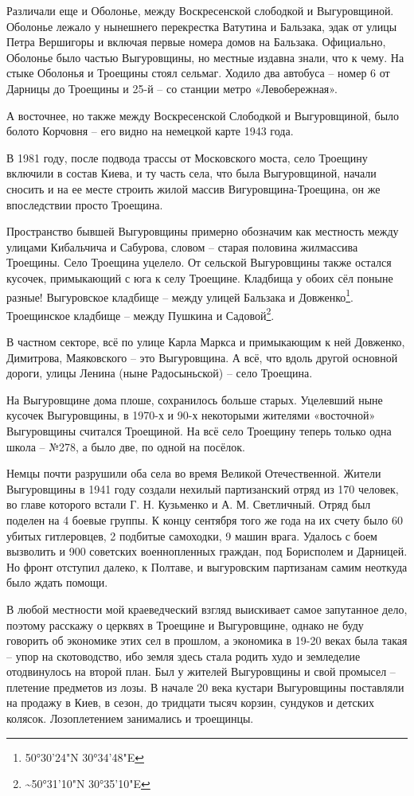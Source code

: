 Различали еще и Оболонье, между Воскресенской слободкой и Выгуровщиной. Оболонье лежало у нынешнего перекрестка Ватутина и Бальзака, эдак от улицы Петра Вершигоры и включая первые номера домов на Бальзака. Официально, Оболонье было частью Выгуровщины, но местные издавна знали, что к чему. На стыке Оболонья и Троещины стоял сельмаг. Ходило два автобуса – номер 6 от Дарницы до Троещины и 25-й – со станции метро «Левобережная».

А восточнее, но также между Воскресенской Слободкой и Выгуровщиной, было болото Корчовня – его видно на немецкой карте 1943 года.

В 1981 году, после подвода трассы от Московского моста, село Троещину включили в состав Киева, и ту часть села, что была Выгуровщиной, начали сносить и на ее месте строить жилой массив Вигуровщина-Троещина, он же впоследствии просто Троещина.

Пространство бывшей Выгуровщины примерно обозначим как местность между улицами Кибальчича и Сабурова, словом – старая половина жилмассива Троещины. Село Троещина уцелело. От сельской Выгуровщины также остался кусочек, примыкающий с юга к селу Троещине. Кладбища у обоих сёл поныне разные! Выгуровское кладбище – между улицей Бальзака и Довженко\footnote{50°30'24"N 30°34'48"E}. Троещинское кладбище – между Пушкина и Садовой\footnote{\textasciitilde{}50°31'10"N 30°35'10"E}.

В частном секторе, всё по улице Карла Маркса и примыкающим к ней Довженко, Димитрова, Маяковского – это Выгуровщина. А всё, что вдоль другой основной дороги, улицы Ленина (ныне Радосыньской) – село Троещина. 

На Выгуровщине дома плоше, сохранилось больше старых. Уцелевший ныне кусочек Выгуровщины, в 1970-х и 90-х некоторыми жителями «восточной» Выгуровщины считался Троещиной. На всё село Троещину теперь только одна школа – №278, а было две, по одной на посёлок.

Немцы почти разрушили оба села во время Великой Отечественной. Жители Выгуровщины в 1941 году создали нехилый партизанский отряд из 170 человек, во главе которого встали Г. Н. Кузьменко и А. М. Светличный. Отряд был поделен на 4 боевые группы. К концу сентября того же года на их счету было 60 убитых гитлеровцев, 2 подбитые самоходки, 9 машин врага. Удалось с боем вызволить и 900 советских военнопленных граждан, под Борисполем и Дарницей. Но фронт отступил далеко, к Полтаве, и выгуровским партизанам самим неоткуда было ждать помощи.

В любой местности мой краеведческий взгляд выискивает самое запутанное дело, поэтому расскажу о церквях в Троещине и Выгуровщине, однако не буду говорить об экономике этих сел в прошлом, а экономика в 19-20 веках была такая – упор на скотоводство, ибо земля здесь стала родить худо и земледелие отодвинулось на второй план. Был у жителей Выгуровщины и свой промысел – плетение предметов из лозы. В начале 20 века кустари Выгуровщины поставляли на продажу в Киев, в сезон, до тридцати тысяч корзин, сундуков и детских колясок. Лозоплетением занимались и троещинцы.

